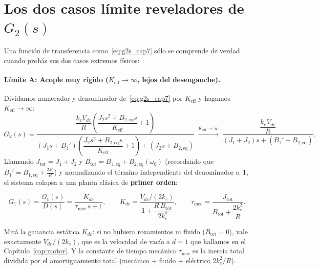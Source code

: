 \documentclass[11pt,a4paper,oneside]{book}
\begin{document}
\section{Los dos casos límite reveladores de \texorpdfstring{$G_2(s)$}{G2(s)}}

Una función de transferencia como~\eqref{eq:g2s_cap7} sólo se comprende de
verdad cuando probás sus dos casos extremos físicos:

\paragraph{Límite A: Acople muy rígido ($K_{\text{eff}} \to \infty$, lejos del desenganche).}
Dividamos numerador y denominador de~\eqref{eq:g2s_cap7} por $K_{\text{eff}}$ y
hagamos $K_{\text{eff}} \to \infty$:
\[
  G_2(s)
  = \frac{\dfrac{k_e V_{dc}}{R}\left(\dfrac{J_2 s^2 + B_{2,\text{eq}}s}{K_{\text{eff}}} + 1\right)}
         {(J_1 s + B_1')\left(\dfrac{J_2 s^2 + B_{2,\text{eq}}s}{K_{\text{eff}}} + 1\right) + (J_2 s + B_{2,\text{eq}})}
  \;\xrightarrow{K_{\text{eff}}\to\infty}\;
  \frac{\dfrac{k_e V_{dc}}{R}}{(J_1 + J_2)s + (B_1' + B_{2,\text{eq}})}.
\]
Llamando $J_{\text{tot}} = J_1 + J_2$ y $B_{\text{tot}} = B_{1,\text{eq}} + B_{2,\text{eq}}(\omega_0)$
(recordando que $B_1' = B_{1,\text{eq}} + \frac{2k_e^2}{R}$) y normalizando el
término independiente del denominador a~1, el sistema colapsa a una planta
clásica de \textbf{primer orden}:
\begin{ecuacionclave}
\begin{equation}
  G_1(s) = \frac{\Omega_1(s)}{D(s)} = \frac{K_{dc}}{\tau_{\text{mec}}\,s + 1},
  \qquad
  K_{dc} = \frac{V_{dc}/(2k_e)}{1 + \dfrac{R\,B_{\text{tot}}}{2k_e^2}},
  \qquad
  \tau_{\text{mec}} = \frac{J_{\text{tot}}}{B_{\text{tot}} + \dfrac{2k_e^2}{R}}.
  \label{eq:g1s_cap7}
\end{equation}
\end{ecuacionclave}
Mirá la ganancia estática $K_{dc}$: si no hubiera rozamientos ni fluido
($B_{\text{tot}} = 0$), vale exactamente $V_{dc}/(2k_e)$, que es la velocidad de
vacío a $d=1$ que hallamos en el Capítulo~\ref{cap:motor}. Y la constante de
tiempo mecánica $\tau_{\text{mec}}$ es la inercia total dividida por el
amortiguamiento total (mecánico + fluido + eléctrico $2k_e^2/R$).
\end{document}
